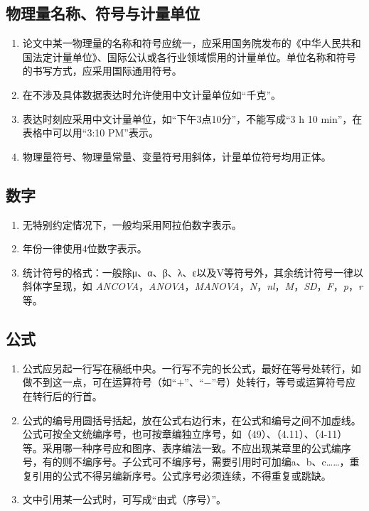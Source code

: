 \subsection{物理量名称、符号与计量单位}

\begin{enumerate}
	\item 论文中某一物理量的名称和符号应统一，应采用国务院发布的《中华人民共和国法定计量单位》、国际公认或各行业领域惯用的计量单位。单位名称和符号的书写方式，应采用国际通用符号。
	\item 在不涉及具体数据表达时允许使用中文计量单位如“千克”。
	\item 表达时刻应采用中文计量单位，如“下午3点10分”，不能写成“3 h 10 min”，在表格中可以用“3:10 PM”表示。
	\item 物理量符号、物理量常量、变量符号用斜体，计量单位符号均用正体。
\end{enumerate}

\subsection{数字}

\begin{enumerate}
	\item 无特别约定情况下，一般均采用阿拉伯数字表示。
	\item 年份一律使用4位数字表示。
	\item 统计符号的格式：一般除μ、α、β、λ、ε以及V等符号外，其余统计符号一律以斜体字呈现，如 \textit{ANCOVA}，\textit{ANOVA}，\textit{MANOVA}，\textit{N}，\textit{nl}，\textit{M}，\textit{SD}，\textit{F}，\textit{p}，\textit{r} 等。
\end{enumerate}

\subsection{公式}

\begin{enumerate}
	\item 公式应另起一行写在稿纸中央。一行写不完的长公式，最好在等号处转行，如做不到这一点，可在运算符号（如“$+$”、“$-$”号）处转行，等号或运算符号应在转行后的行首。
	\item 公式的编号用圆括号括起，放在公式右边行末，在公式和编号之间不加虚线。公式可按全文统编序号，也可按章编独立序号，如（49）、（4.11）、（4-11）等。采用哪一种序号应和图序、表序编法一致。不应出现某章里的公式编序号，有的则不编序号。子公式可不编序号，需要引用时可加编a、b、c……，重复引用的公式不得另编新序号。公式序号必须连续，不得重复或跳缺。
	\item 文中引用某一公式时，可写成“由式（序号）”。
\end{enumerate}

